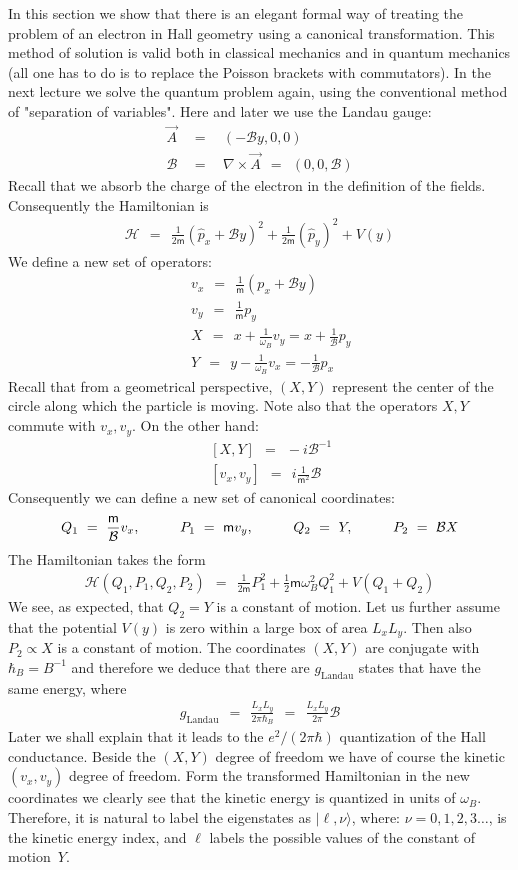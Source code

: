 \documentclass[onecolumn,fleqn, 11pt]{revtex4}
\newcommand{\mass}{\mathsf{m}}
\newcommand{\beq}{\begin{eqnarray}}
\newcommand{\eeq}{\end{eqnarray}}
\begin{document}
In this section we show that there is 
an elegant formal way of treating the problem 
of an electron in Hall geometry using 
a canonical transformation. 
This method of solution is valid both in classical 
mechanics and in quantum mechanics (all one has to 
do is to replace the Poisson brackets with commutators). 
In the next lecture we solve the quantum problem 
again, using the conventional method of "separation of variables". 
Here and later we use the Landau gauge: 
\beq
\vec{A} & \ \ = \ \ & (-\mathcal{B}y,0,0)
\\ \nonumber
\mathcal{B} & \ \ = \ \ & \nabla \times \vec{A} \ \ = \ \ (0,0,\mathcal{B}) 
\eeq
Recall that we absorb the charge of the electron 
in the definition of the fields. 
Consequently the Hamiltonian is 
\beq
\mathcal{H} 
\ \ = \ \ \frac{1}{2\mass}( \hat{p}_x+\mathcal{B}y)^2 
+ \frac{1}{2\mass}( \hat{p}_y)^2 + V(y) 
\eeq
We define a new set of operators:
\beq
&& v_x \ \ = \ \ \frac{1}{\mass}( p_x + \mathcal{B}y )
\\ \nonumber
&& v_y \ \ = \ \ \frac{1}{\mass} p_y
\\ \nonumber
&& X \ \ = \ \ x + \frac{1}{\omega_B} v_y = x + \frac{1}{\mathcal{B}}p_y
\\ \nonumber
&& Y \ \ = \ \ y - \frac{1}{\omega_B} v_x = - \frac{1}{\mathcal{B}} p_x 
\eeq
Recall that from a geometrical perspective, ${(X,Y)}$ represent 
the center of the circle along which the particle is moving. 
Note also that the operators ${X,Y}$ 
commute with ${v_x,v_y}$. On the other hand:
\beq
&& [X,Y] \ \ = \ \ -i\mathcal{B}^{-1} 
\\ \nonumber
&& [v_x, v_y] \ \ = \ \ i\frac{1}{\mass^2} \mathcal{B} 
\eeq
Consequently we can define a new set of canonical coordinates:
\beq
Q_1 \ = \ \frac{\mass}{\mathcal{B}} v_x,
\hspace*{1cm}
P_1 \ = \ \mass v_y,
\hspace*{1cm}
Q_2 \ = \ Y,
\hspace*{1cm}
P_2 \ = \ \mathcal{B} X 
\eeq
The Hamiltonian takes the form
\beq
\mathcal{H}(Q_1,P_1,Q_2,P_2) 
\ \ = \ \ \frac{1}{2\mass}P_1^2 
+ \frac{1}{2} \mass \omega_B^2 Q_1^2 
+ V(Q_1 + Q_2) 
\eeq
We see, as expected, that ${Q_2 = Y}$ is a constant of motion. 
Let us further assume that the potential $V(y)$ is zero within 
a large box of area $L_xL_y$. Then also ${P_2 \propto X}$ 
is a constant of motion. The coordinates ${(X,Y)}$ are 
conjugate with $\hbar_B=B^{-1}$ and therefore we deduce that 
there are $g_{\text{Landau}}$ states that have the same energy, where 
\beq
g_{\text{Landau}} 
\ \ = \ \ \frac{L_x L_y}{2\pi \hbar_B}
\ \ = \ \ \frac{L_x L_y}{2\pi}\mathcal{B} 
\eeq
Later we shall explain that it leads to the $e^2/(2\pi\hbar)$ 
quantization of the Hall conductance.  
Beside the ${(X,Y)}$ degree of freedom we have of course 
the kinetic ${(v_x,v_y)}$ degree of freedom. 
Form the transformed Hamiltonian in the new coordinates  
we clearly see that the kinetic energy is quantized 
in units of ${\omega_B}$.  
Therefore, it is natural to label the eigenstates 
as ${|\ell , \nu \rangle}$, where: ${\nu = 0,1,2,3 \dots }$, 
is the kinetic energy index, and $\ell$ labels 
the possible values of the constant of motion~$Y$.  
\end{document}
